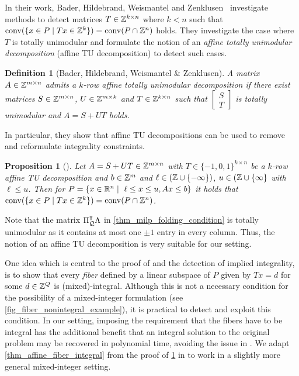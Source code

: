 \documentclass[pdflatex,sn-mathphys-num]{sn-jnl}%
\theoremstyle{thmstyleone}%
\newtheorem{definition}{Definition}
\newtheorem{proposition}[proposition]{Proposition}
\theoremstyle{thmstylethree}%
\theoremstyle{thmstyletwo}%
\newcommand{\conv}{\mathrm{conv}}
\begin{document}
In their work, Bader, Hildebrand, Weismantel and Zenklusen~\cite{BaderHWZ18} investigate methods to detect matrices $T\in \mathbb{Z}^{k\times n}$ where $k < n$ such that $\conv(\{x \in P \mid T x \in \Z^k\}) = \conv(P\cap \Z^n) $ holds. They investigate the case where $T$ is totally unimodular and formulate the notion of an \emph{affine totally unimodular decomposition} (affine TU decomposition) to detect such cases. 

\begin{definition}[Bader, Hildebrand, Weismantel \& Zenklusen\cite{BaderHWZ18}]
A matrix $A\in \mathbb{Z}^{m\times n}$ admits a \emph{$k$-row affine totally unimodular decomposition} if there exist matrices $S \in \mathbb{Z}^{m\times n}$, $U\in \mathbb{Z}^{m\times k}$ and $T\in \mathbb{Z}^{k\times n}$ such that $\begin{bmatrix}
    S\\
    T
\end{bmatrix}$ is totally unimodular and $A = S + U T$ holds.
\end{definition}

In particular, they show that affine TU decompositions can be used to remove and reformulate integrality constraints. 
\begin{proposition}[\cite{BaderHWZ18}]
    \label{thm_atu_ilp_integral}
    Let $A = S + UT \in \mathbb{Z}^{m\times n}$ with $T\in \{-1,0,1\}^{k\times n}$ be a $k$-row affine TU decomposition and $b\in \mathbb{Z}^m$ and $\ell\in (\mathbb{Z}\cup \{-\infty\})$, $u\in(\mathbb{Z}\cup \{\infty\}$ with $\ell \leq u$. Then for $P = \{x\in \mathbb{R}^n \mid~\ell \leq x \leq u, Ax \leq b\}$ it holds that $\conv(\{x\in P \mid Tx \in \Z^k\}) = \conv(P\cap \Z^n)$.
\end{proposition}
Note that the matrix $\Pi_{\mathcal{Q}}^{\intercal} \Lambda$ in \eqref{thm_milp_folding_condition} is totally unimodular as it contains at most one $\pm 1$ entry in every column. Thus, the notion of an affine TU decomposition is very suitable for our setting.

One idea which is central to the proof of  and the detection of implied integrality, is to show that every \emph{fiber} defined by a linear subspace of $P$ given by $T x = d$ for some $d\in \mathbb{Z}^Q$ is (mixed)-integral. Although this is not a necessary condition for the possibility of a mixed-integer formulation (see \cref{fig_fiber_nonintegral_example}), it is practical to detect and exploit this condition. In our setting, imposing the requirement that the fibers have to be integral has the additional benefit that an integral solution to the original problem may be recovered in polynomial time, avoiding the issue in . We adapt  \cref{thm_affine_fiber_integral} from the proof of \cref{thm_atu_ilp_integral} in \cite{BaderHWZ18} to work in a slightly more general mixed-integer setting.
\end{document}
